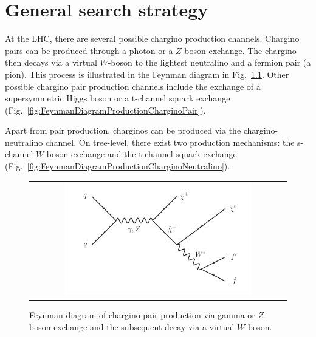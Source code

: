 \FloatBarrier
\chapter{General search strategy}
\label{sec:GeneralSearchStrategy}

At the LHC, there are several possible chargino production channels. 
Chargino pairs can be produced through a photon or a $Z$-boson exchange. 
The chargino then decays via a virtual $W$-boson to the lightest neutralino and a fermion pair (\eg a pion). 
This process is illustrated in the Feynman diagram in Fig.~\ref{fig:FeynmanDiagram}.
Other possible chargino pair production channels include the exchange of a supersymmetric Higgs boson or a t-channel squark exchange (Fig.~\ref{fig:FeynmanDiagramProductionCharginoPair}).

Apart from pair production, charginos can be produced via the chargino-neutralino channel. 
On tree-level, there exist two production mechanisms: the s-channel $W$-boson exchange and the t-channel squark exchange (Fig.~\ref{fig:FeynmanDiagramProductionCharginoNeutralino}).
\begin{figure}[!b]
  \centering 
  \begin{tabular}{c}
    \includegraphics[width=0.75\textwidth]{figures/analysis/ChiChi_ProductionAndDecay.pdf}
  \end{tabular}
  \caption{Feynman diagram of chargino pair production via gamma or $Z$-boson exchange and the subsequent decay via a virtual $W$-boson.}
  \label{fig:FeynmanDiagram}
\end{figure}

